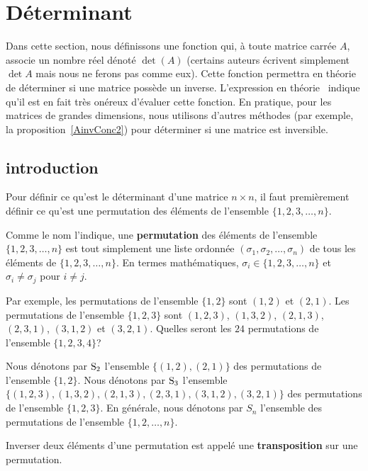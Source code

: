 {\section{Déterminant}\label{DetermSect}

Dans cette section, nous définissons une fonction qui, à toute matrice
carrée $A$, associe un nombre réel dénoté $\det(A)$ (certains auteurs
écrivent simplement $\det A$ mais nous ne ferons pas comme eux).
Cette fonction permettra en théorie de déterminer si une matrice
possède un inverse.  L'expression \lgm en théorie \rgm\ indique
qu'il est en fait très onéreux d'évaluer cette fonction.  En pratique,
pour les matrices de grandes dimensions, nous utilisons d'autres méthodes
(par exemple, la proposition~\ref{AinvConc2}) pour déterminer si une
matrice est inversible.

\subsection{introduction}

Pour définir ce qu'est le déterminant d'une matrice $n \times n$, il
faut premièrement définir ce qu'est une permutation des éléments de
l'ensemble $\{ 1, 2, 3, \ldots, n\}$.

\begin{focus}{\dfn}
Comme le nom l'indique, une {\bfseries permutation} des éléments de
l'ensemble $\{ 1, 2, 3, \ldots, n\}$ est tout simplement une liste
ordonnée $(\sigma_1, \sigma_2, \ldots, \sigma_n)$ de tous les éléments
de $\{1, 2, 3, \ldots, n\}$.  En termes mathématiques, 
$\sigma_i \in \{ 1, 2, 3, \ldots, n\}$ et $\sigma_i \neq \sigma_j$ pour
$i \neq j$.
\end{focus}

Par exemple, les permutations de l'ensemble $\{1,2\}$ sont $(1,2)$ et
$(2,1)$.  Les permutations de l'ensemble $\{1,2,3\}$ sont $(1,2,3)$,
$(1,3,2)$, $(2,1,3)$, $(2,3,1)$, $(3,1,2)$ et $(3,2,1)$.  Quelles
seront les $24$ permutations de l'ensemble $\{1,2,3,4\}$?

Nous dénotons par $\mathrm{S}_{2}$ l'ensemble $\{ (1,2), (2,1) \}$ des
permutations de l'ensemble $\{1,2\}$.  Nous dénotons par $\mathrm{S}_{3}$
l'ensemble $\{ (1,2,3), (1,3,2), (2,1,3), (2,3,1), (3,1,2), (3,2,1)
\}$ des permutations de l'ensemble $\{1,2,3\}$.  En générale, nous
dénotons par $S_{n}$ l'ensemble des permutations de l'ensemble
$\{1,2,\ldots, n\}$. 

\begin{focus}{\dfn}
Inverser deux éléments d'une permutation est appelé une
{\bfseries transposition} sur une permutation.
\end{focus}

}
